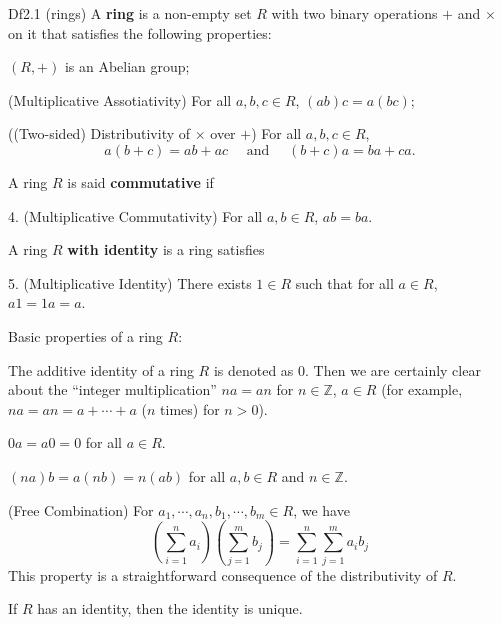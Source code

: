 \documentclass{article}
\begin{document}
\begin{Df}{Df2.1 (rings)}
    A \textbf{ring} is a non-empty set $R$ with two binary operations $+$ and $\times$ on it that satisfies the following properties:
    \begin{compactenum}
        \item $(R, +)$ is an Abelian group;
        \item (Multiplicative Assotiativity) For all $a, b, c \in R$, $(ab)c = a(bc)$;
        \item ((Two-sided) Distributivity of $\times$ over $+$) For all $a, b, c \in R$, 
        $$ a(b+c) = ab + ac \quad\text{ and }\quad (b+c)a = ba + ca. $$
    \end{compactenum}
    A ring $R$ is said \textbf{commutative} if
    \begin{compactenum}
        \item[4.] (Multiplicative Commutativity) For all $a, b \in R$, $ab = ba$.
    \end{compactenum}
    A ring $R$ \textbf{with identity} is a ring satisfies
    \begin{compactenum}
        \item[5.] (Multiplicative Identity) There exists $1 \in R$ such that for all $a \in R$, $a1 = 1a = a$.
    \end{compactenum}
\end{Df}

\begin{Rmk}{}
    Basic properties of a ring $R$:
    \begin{compactenum}
        \item \textcolor{Df}{The additive identity of a ring $R$ is denoted as $0$. Then we are certainly clear about the ``integer multiplication'' $na = an$ for $n\in\mathbb{Z}$, $a\in R$ (for example, $na = an = a + \cdots + a$ ($n$ times) for $n>0$).}
        \item \textcolor{Th}{$0a = a0 = 0$ for all $a \in R$.}
        \item \textcolor{Th}{$(na)b = a(nb) = n(ab)$ for all $a, b \in R$ and $n\in\mathbb{Z}$.}
        \item \textcolor{Th}{(Free Combination) For $a_1, \cdots, a_n, b_1, \cdots, b_m \in R$, we have
        $$ \left(\sum_{i=1}^{n} a_i\right) \left(\sum_{j=1}^{m} b_j\right) = \sum_{i=1}^{n} \sum_{j=1}^{m} a_i b_j $$
        } This property is a straightforward consequence of the distributivity of $R$.
        \item \textcolor{Th}{If $R$ has an identity, then the identity is unique.} 
    \end{compactenum}
\end{Rmk}
\end{document}
